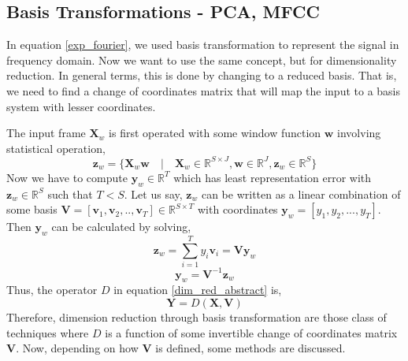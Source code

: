 \subsection{Basis Transformations - PCA, MFCC}
\label{basis}

In equation \ref{exp_fourier}, we used basis transformation to represent the signal in frequency domain. Now we want to use the same concept, but for dimensionality reduction. In general terms, this is done by changing to a reduced basis. That is, we need to find a change of coordinates matrix that will map the input to a basis system with lesser coordinates. 
\bigskip

\noindent The input frame $\textbf{X}_{w}$ is first operated with some window function $\textbf{w}$ involving statistical operation,
\[
  \textbf{z}_{w} = \{\textbf{X}_{w}\textbf{w} \quad | \quad \textbf{X}_{w} \in \mathbb{R}^{S \times J}, \textbf{w} \in \mathbb{R}^{J}, \textbf{z}_{w} \in \mathbb{R}^{S}\}
\]    
Now we have to compute $\textbf{y}_{w} \in \mathbb{R}^{T}$ which has least representation error with $\textbf{z}_{w} \in \mathbb{R}^{S}$ such that $T < S$. Let us say, $\textbf{z}_{w}$ can be written as a linear combination of some basis $\textbf{V} = [\textbf{v}_{1}, \textbf{v}_{2}, ..,\textbf{v}_{T}] \in \mathbb{R}^{S \times T}$ with coordinates $\textbf{y}_{w} = [y_{1}, y_{2},...,y_{T}]$. Then $\textbf{y}_{w}$ can be calculated by solving,
\[
\textbf{z}_{w} = \displaystyle\sum_{i=1}^{T}y_{i}\textbf{v}_{i} = \textbf{V}\textbf{y}_{w}
\]
\[
\textbf{y}_{w} = \textbf{V}^{-1}\textbf{z}_{w}
\]
Thus, the operator $D$ in equation \ref{dim_red_abstract} is,
\[
\textbf{Y} = D(\textbf{X}, \textbf{V})
\]
Therefore, dimension reduction through basis transformation are those class of techniques where $D$ is a function of some invertible change of coordinates matrix $\textbf{V}$. Now, depending on how $\textbf{V}$ is defined, some methods are discussed.

